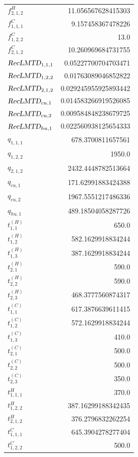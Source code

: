\documentclass{article}%
\begin{document}
\begin{multicols*}{3}
\begin{supertabular}{lr}
	$f_{2,1,2}^{H}$ & 11.056567628415303 \\%
	$f_{1,1,1}^{C}$ & 9.157458367478226 \\%
	$f_{1,2,2}^{C}$ & 13.0 \\%
	$f_{2,1,2}^{C}$ & 10.260969684731755 \\%
	$\textsl{RecLMTD}_{1,1,1}$ & 0.05227700704703471 \\%
	$\textsl{RecLMTD}_{1,2,2}$ & 0.01763089046852822 \\%
	$\textsl{RecLMTD}_{2,1,2}$ & 0.029245955925893442 \\%
	$\textsl{RecLMTD}_{cu,1}$ & 0.014583266919526085 \\%
	$\textsl{RecLMTD}_{cu,2}$ & 0.009584848238679725 \\%
	$\textsl{RecLMTD}_{hu,1}$ & 0.022560938125654333 \\%
	$q_{1,1,1}$ & 678.3700811657561 \\%
	$q_{1,2,2}$ & 1950.0 \\%
	$q_{2,1,2}$ & 2432.4448782513664 \\%
	$q_{cu,1}$ & 171.62991883424388 \\%
	$q_{cu,2}$ & 1967.5551217486336 \\%
	$q_{hu,1}$ & 489.18504058287726 \\%
	$t_{1,1}^{(H)}$ & 650.0 \\%
	$t_{1,2}^{(H)}$ & 582.1629918834244 \\%
	$t_{1,3}^{(H)}$ & 387.1629918834244 \\%
	$t_{2,1}^{(H)}$ & 590.0 \\%
	$t_{2,2}^{(H)}$ & 590.0 \\%
	$t_{2,3}^{(H)}$ & 468.3777560874317 \\%
	$t_{1,1}^{(C)}$ & 617.3876639611415 \\%
	$t_{1,2}^{(C)}$ & 572.1629918834244 \\%
	$t_{1,3}^{(C)}$ & 410.0 \\%
	$t_{2,1}^{(C)}$ & 500.0 \\%
	$t_{2,2}^{(C)}$ & 500.0 \\%
	$t_{2,3}^{(C)}$ & 350.0 \\%
	$t_{1,1,1}^{H}$ & 370.0 \\%
	$t_{1,2,2}^{H}$ & 387.16299188342435 \\%
	$t_{2,1,2}^{H}$ & 376.2796832262254 \\%
	$t_{1,1,1}^{C}$ & 645.3904278277404 \\%
	$t_{1,2,2}^{C}$ & 500.0 \\%

\end{supertabular}
\end{multicols*}
\end{document}
